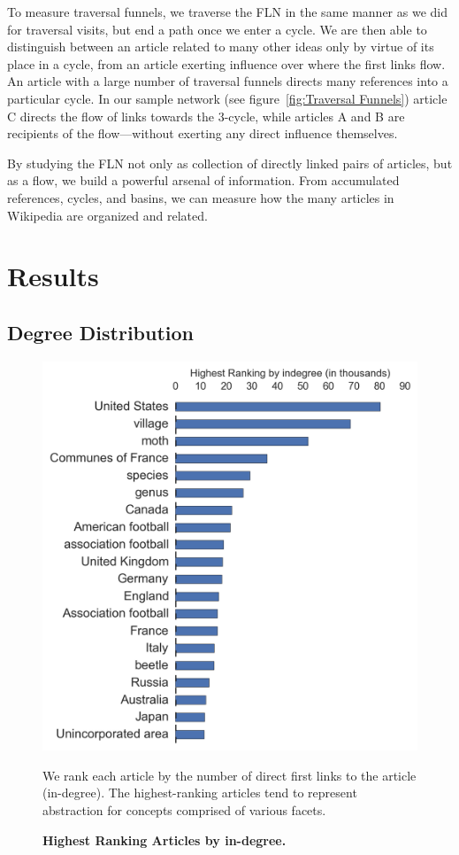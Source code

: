 \documentclass[pre,twocolumn,twoside,superscriptaddress,floatfix, aps, 10pt]{revtex4-1}
\begin{document}
To measure traversal funnels, we traverse the FLN in the same manner as we 
did for traversal visits, but end a path once we enter a cycle.
We are then able to distinguish between an article related to many other ideas
only by virtue of its place in a cycle, from an article exerting influence over where the first links flow. 
An article with a large number of traversal funnels directs many references
into a particular cycle. In our sample network 
(see figure~\ref{fig:Traversal Funnels}) article C 
directs the flow of links towards the 3-cycle, while articles A and B are 
recipients of the flow---without exerting any direct influence themselves. 

By studying the FLN not only as collection of directly linked pairs of articles, but
as a flow, 
we build a powerful arsenal of information.
From accumulated references, cycles, and basins, we can measure how the many articles in Wikipedia are organized and related.





\section{Results}

\subsection{Degree Distribution}

\begin{figure}[tp!]
  \centering	
  \includegraphics[width=\columnwidth]{graphics/articles_ndegree.png}
  \caption{
    \textbf{Highest Ranking Articles by in-degree.}
  }
  We rank each article by the number of direct first links to the article (in-degree). The highest-ranking articles tend to represent abstraction for concepts
  comprised of various facets.
  \label{fig:ndegree list}
\end{figure}
\end{document}
